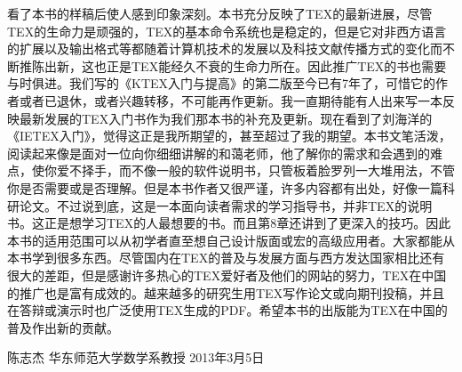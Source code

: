 \documentclass[UTF8]{ctexart}
\begin{document}
看了本书的样稿后使人感到印象深刻。本书充分反映了TEX的最新进展，尽管TEX的生命力是顽强的，TEX的基本命令系统也是稳定的，但是它对非西方语言的扩展以及输出格式等都随着计算机技术的发展以及科技文献传播方式的变化而不断推陈出新，这也正是TEX能经久不衰的生命力所在。因此推广TEX的书也需要与时俱进。我们写的《KTEX入门与提高》的第二版至今已有7年了，可惜它的作者或者已退休，或者兴趣转移，不可能再作更新。我一直期待能有人出来写一本反映最新发展的TEX入门书作为我们那本书的补充及更新。现在看到了刘海洋的《IETEX入门》，觉得这正是我所期望的，甚至超过了我的期望。本书文笔活泼，阅读起来像是面对一位向你细细讲解的和蔼老师，他了解你的需求和会遇到的难点，使你爱不择手，而不像一般的软件说明书，只管板着脸罗列一大堆用法，不管你是否需要或是否理解。但是本书作者又很严谨，许多内容都有出处，好像一篇科研论文。不过说到底，这是一本面向读者需求的学习指导书，并非TEX的说明书。这正是想学习TEX的人最想要的书。而且第8章还讲到了更深入的技巧。因此本书的适用范围可以从初学者直至想自己设计版面或宏的高级应用者。大家都能从本书学到很多东西。尽管国内在TEX的普及与发展方面与西方发达国家相比还有很大的差距，但是感谢许多热心的TEX爱好者及他们的网站的努力，TEX在中国的推广也是富有成效的。越来越多的研究生用TEX写作论文或向期刊投稿，并且在答辩或演示时也广泛使用TEX生成的PDF。希望本书的出版能为TEX在中国的普及作出新的贡献。

陈志杰
华东师范大学数学系教授
2013年3月5日
\end{document}
